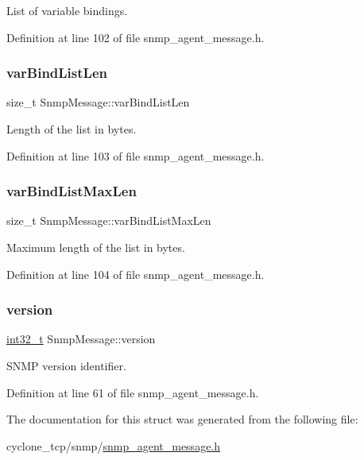 List of variable bindings. 



Definition at line 102 of file snmp\+\_\+agent\+\_\+message.\+h.

\mbox{\label{structSnmpMessage_a877d26bc0ae8ef5c78ac645a2ba112ea}} 
\subsubsection{\texorpdfstring{var\+Bind\+List\+Len}{varBindListLen}}
{\footnotesize\ttfamily size\+\_\+t Snmp\+Message\+::var\+Bind\+List\+Len}



Length of the list in bytes. 



Definition at line 103 of file snmp\+\_\+agent\+\_\+message.\+h.

\mbox{\label{structSnmpMessage_a926db41b5b7d0a3bc6394ebb63c310b0}} 
\subsubsection{\texorpdfstring{var\+Bind\+List\+Max\+Len}{varBindListMaxLen}}
{\footnotesize\ttfamily size\+\_\+t Snmp\+Message\+::var\+Bind\+List\+Max\+Len}



Maximum length of the list in bytes. 



Definition at line 104 of file snmp\+\_\+agent\+\_\+message.\+h.

\mbox{\label{structSnmpMessage_a38b300782f7395005708f45f26dae7c1}} 
\subsubsection{\texorpdfstring{version}{version}}
{\footnotesize\ttfamily \hyperlink{stdint_8h_ab1967d8591af1a4e48c37fd2b0f184d0}{int32\+\_\+t} Snmp\+Message\+::version}



S\+N\+MP version identifier. 



Definition at line 61 of file snmp\+\_\+agent\+\_\+message.\+h.



The documentation for this struct was generated from the following file\+:\begin{DoxyCompactItemize}
\item 
cyclone\+\_\+tcp/snmp/\hyperlink{snmp__agent__message_8h}{snmp\+\_\+agent\+\_\+message.\+h}\end{DoxyCompactItemize}
